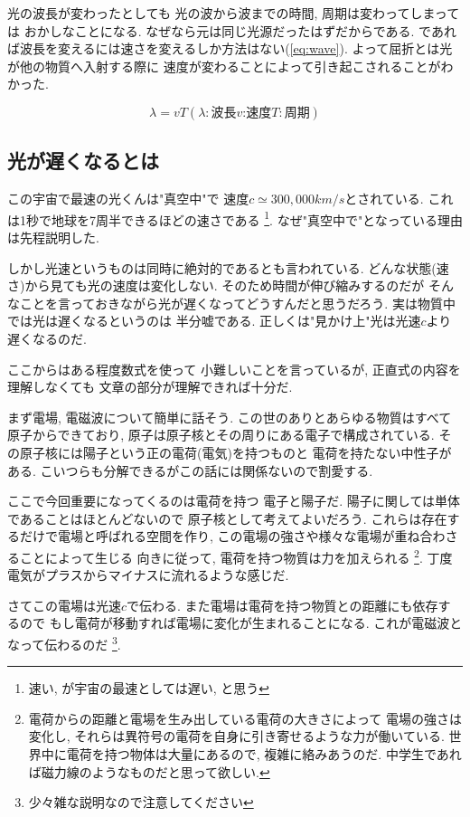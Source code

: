 \documentclass[a4paper, xelatex, ja=standard]{bxjsarticle}
\begin{document}
光の波長が変わったとしても
光の波から波までの時間, 周期は変わってしまっては
おかしなことになる.
なぜなら元は同じ光源だったはずだからである.
であれば波長を変えるには速さを変えるしか方法はない(\ref{eq:wave}).
よって屈折とは光が他の物質へ入射する際に
速度が変わることによって引き起こされることがわかった.

\begin{equation}
\lambda=vT (\lambda:\mbox{波長}v\mbox{:速度}T:\mbox{周期})\label{eq:wave}
\end{equation}

\subsection{光が遅くなるとは}
この宇宙で最速の光くんは"真空中"で
速度$c\simeq 300,000\si{km/s}$とされている.
これは1秒で地球を7周半できるほどの速さである
\footnote{速い, が宇宙の最速としては遅い, と思う}.
なぜ"真空中で"となっている理由は先程説明した.

しかし光速というものは同時に絶対的であるとも言われている.
どんな状態(速さ)から見ても光の速度は変化しない.
そのため時間が伸び縮みするのだが
そんなことを言っておきながら光が遅くなってどうすんだと思うだろう.
実は物質中では光は遅くなるというのは
半分嘘である.
正しくは"見かけ上"光は光速$c$より遅くなるのだ.

ここからはある程度数式を使って
小難しいことを言っているが,
正直式の内容を理解しなくても
文章の部分が理解できれば十分だ.

まず電場, 電磁波について簡単に話そう.
この世のありとあらゆる物質はすべて原子からできており,
原子は原子核とその周りにある電子で構成されている.
その原子核には陽子という正の電荷(電気)を持つものと
電荷を持たない中性子がある.
こいつらも分解できるがこの話には関係ないので割愛する.

ここで今回重要になってくるのは電荷を持つ
電子と陽子だ.
陽子に関しては単体であることはほとんどないので
原子核として考えてよいだろう.
これらは存在するだけで電場と呼ばれる空間を作り,
この電場の強さや様々な電場が重ね合わさることによって生じる
向きに従って, 電荷を持つ物質は力を加えられる
\footnote{電荷からの距離と電場を生み出している電荷の大きさによって
電場の強さは変化し, それらは異符号の電荷を自身に引き寄せるような力が働いている.
世界中に電荷を持つ物体は大量にあるので, 複雑に絡みあうのだ.
中学生であれば磁力線のようなものだと思って欲しい.}.
丁度電気がプラスからマイナスに流れるような感じだ.

さてこの電場は光速$c$で伝わる.
また電場は電荷を持つ物質との距離にも依存するので
もし電荷が移動すれば電場に変化が生まれることになる.
これが電磁波となって伝わるのだ
\footnote{少々雑な説明なので注意してください}.
\end{document}
